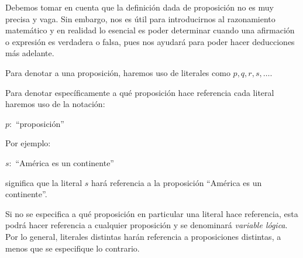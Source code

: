 Debemos tomar en cuenta que la definición dada de proposición no es muy precisa y vaga. Sin embargo, nos es útil para introducirnos al razonamiento matemático y en realidad lo esencial es poder determinar cuando una afirmación o expresión es verdadera o falsa, pues nos ayudará para poder hacer deducciones más adelante.
\begin{notation}
	Para denotar a una proposición, haremos uso de literales como $p, q, r, s,\ldots$.\par 
	Para denotar específicamente a qué proposición hace referencia cada literal haremos uso de la notación:
	\begin{center}
		$p:$ ``proposición''
	\end{center}
	Por ejemplo:
	\begin{center}
		$s:$ ``América es un continente''
	\end{center}
	significa que la literal $s$ hará referencia a la proposición ``América es un continente''.\par 
	Si no se especifica a qué proposición en particular una literal hace referencia, esta podrá hacer referencia a cualquier proposición y se denominará \emph{variable lógica}. Por lo general, literales distintas harán referencia a proposiciones distintas, a menos que se especifique lo contrario.
\end{notation}
